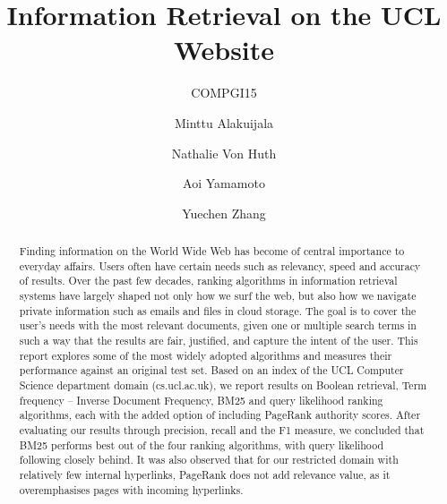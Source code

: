 \documentclass[sigconf]{acmart}
\begin{document}
\title{Information Retrieval on the UCL Website}
\subtitle{COMPGI15}


\author{Minttu Alakuijala}
\affiliation{\institution{}}

\author{Nathalie Von Huth}
\affiliation{\institution{}}

\author{Aoi Yamamoto}
\affiliation{\institution{}}

\author{Yuechen Zhang}
\affiliation{\institution{}}



\begin{abstract}
Finding information on the World Wide Web has become of central importance to everyday affairs. Users often have certain needs such as relevancy, speed and accuracy of results. Over the past few decades, ranking algorithms in information retrieval systems have largely shaped not only how we surf the web, but also how we navigate private information such as emails and files in cloud storage. The goal is to cover the user's needs with the most relevant documents, given one or multiple search terms in such a way that the results are fair, justified, and capture the intent of the user. This report explores some of the most widely adopted algorithms and measures their performance against an original test set. Based on an index of the UCL Computer Science department domain (cs.ucl.ac.uk), we report results on Boolean retrieval, Term frequency -- Inverse Document Frequency, BM25 and query likelihood ranking algorithms, each with the added option of including PageRank authority scores. After evaluating our results through precision, recall and the F1 measure, we concluded that BM25 performs best out of the four ranking algorithms, with query likelihood following closely behind. It was also observed that for our restricted domain with relatively few internal hyperlinks, PageRank does not add relevance value, as it overemphasises pages with incoming hyperlinks.
\end{abstract}

\maketitle




 
\end{document}
